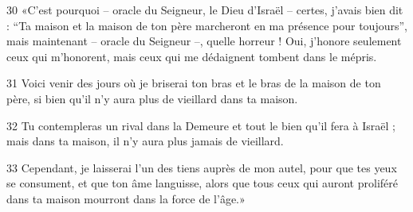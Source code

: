 
30 «C’est pourquoi – oracle du Seigneur, le Dieu d’Israël – certes, j’avais bien dit : “Ta maison et la maison de ton père marcheront en ma présence pour toujours”, mais maintenant – oracle du Seigneur –, quelle horreur ! Oui, j’honore seulement ceux qui m’honorent, mais ceux qui me dédaignent tombent dans le mépris.

31 Voici venir des jours où je briserai ton bras et le bras de la maison de ton père, si bien qu’il n’y aura plus de vieillard dans ta maison.

32 Tu contempleras un rival dans la Demeure et tout le bien qu’il fera à Israël ; mais dans ta maison, il n’y aura plus jamais de vieillard.

33 Cependant, je laisserai l’un des tiens auprès de mon autel, pour que tes yeux se consument, et que ton âme languisse, alors que tous ceux qui auront proliféré dans ta maison mourront dans la force de l’âge.»